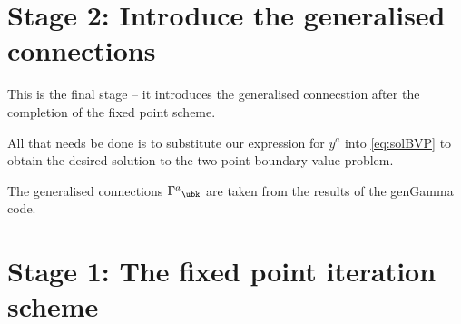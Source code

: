 \documentclass[12pt]{cdblatex}
\begin{document}
\section*{Stage 2: Introduce the generalised connections}

This is the final stage -- it introduces the generalised connecstion after the
completion of the fixed point scheme.

All that needs be done is to substitute our expression for $y^a$ into \eqref{eq:solBVP}
to obtain the desired solution to the two point boundary value problem.

The generalised connections $\Gamma^{a}{}_{\ubk}$ are taken from the results of the
{\tts genGamma} code.

\clearpage

\section*{Stage 1: The fixed point iteration scheme}
\end{document}

